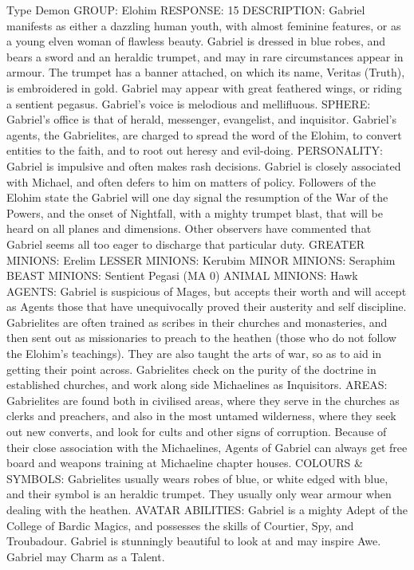 \begin{Description}
\item[Type] Demon
GROUP: Elohim
RESPONSE: 15%
DESCRIPTION: Gabriel manifests as either a dazzling human youth, with almost feminine features, or as a young elven woman of flawless beauty. Gabriel is dressed in blue robes, and bears a sword and an heraldic trumpet, and may in rare circumstances appear in armour.  The trumpet has a banner attached, on which its name, Veritas (Truth), is embroidered in gold. Gabriel may appear with great feathered wings, or riding a sentient pegasus. Gabriel's voice is melodious and mellifluous.
SPHERE: Gabriel's office is that of herald, messenger, evangelist, and inquisitor.  Gabriel's agents, the Gabrielites, are charged to spread the word of the Elohim, to convert entities to the faith, and to root out heresy and evil-doing. 
PERSONALITY: Gabriel is impulsive and often makes rash decisions.  Gabriel is closely associated with Michael, and often defers to him on matters of policy. Followers of the Elohim state the Gabriel will one day signal the resumption of the War of the Powers, and the onset of Nightfall, with a mighty trumpet blast, that will be heard on all planes and dimensions. Other observers have commented that Gabriel seems all too eager to discharge that particular duty.
GREATER MINIONS: Erelim 
LESSER MINIONS: Kerubim 
MINOR MINIONS: Seraphim 
BEAST MINIONS: Sentient Pegasi (MA 0)
ANIMAL MINIONS: Hawk
AGENTS: Gabriel is suspicious of Mages, but accepts their worth  and will accept as Agents those that have unequivocally proved their austerity and self discipline. Gabrielites are often trained as scribes in their churches and monasteries, and then sent out as missionaries to preach to the heathen (those who do not follow the Elohim's teachings). They are also taught the arts of war, so as to aid in getting their point across. Gabrielites check on the purity of the doctrine in established churches, and work along side Michaelines as Inquisitors. 
AREAS: Gabrielites are found both in civilised areas, where they serve in the churches as clerks and preachers, and also in the most untamed wilderness, where they seek out new converts, and look for cults and other signs of corruption. Because of their close association with the Michaelines, Agents of Gabriel can always get free board and weapons training at Michaeline chapter houses.
COLOURS \& SYMBOLS: Gabrielites usually wears robes of blue, or white edged with blue, and their symbol is an heraldic trumpet. They usually only wear armour when dealing with the heathen.
AVATAR ABILITIES: Gabriel is a mighty Adept of the College of Bardic Magics, and possesses  the skills of Courtier, Spy, and Troubadour. Gabriel is stunningly beautiful to look at and may inspire Awe. Gabriel may Charm as a Talent.


\end{Description}
